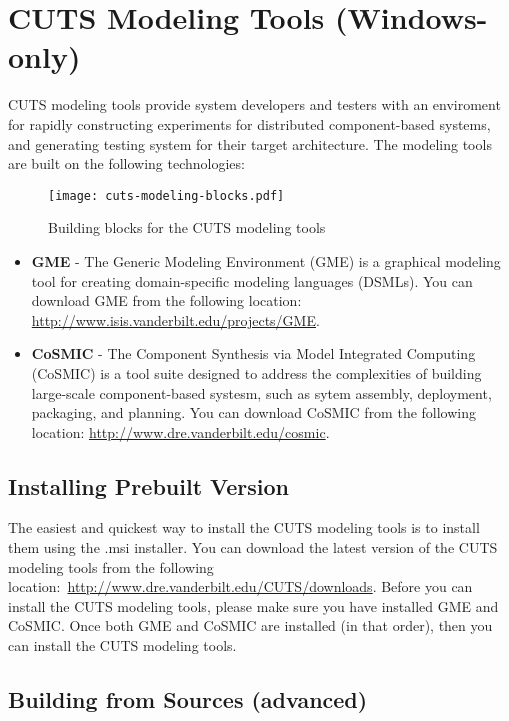 \section{CUTS Modeling Tools (Windows-only)}

CUTS modeling tools provide system developers and testers with an enviroment
for rapidly constructing experiments for distributed component-based systems,
and generating testing system for their target architecture. The modeling
tools are built on the following technologies:
\begin{figure}[htbp]
  \centering
  \texttt{[image: cuts-modeling-blocks.pdf]}
  \caption{Building blocks for the CUTS modeling tools}
  \label{fig:cuts-modeling-blocks}
\end{figure}

\begin{itemize}
  \item \textbf{GME} - The Generic Modeling Environment (GME) is a graphical
  modeling tool for creating domain-specific modeling languages (DSMLs). You
  can download GME from the following location: \url{http://www.isis.vanderbilt.edu/projects/GME}.

  \item \textbf{CoSMIC} - The Component Synthesis via Model Integrated 
  Computing (CoSMIC) is a tool suite designed to address the complexities of
  building large-scale component-based systesm, such as sytem assembly, 
  deployment, packaging, and planning. You can download CoSMIC from the following
  location: \url{http://www.dre.vanderbilt.edu/cosmic}.
\end{itemize}

\subsection{Installing Prebuilt Version}

The easiest and quickest way to install the CUTS modeling tools is to install
them using the .msi installer. You can download the latest version of the 
CUTS modeling tools from the following location:~\url{http://www.dre.vanderbilt.edu/CUTS/downloads}.
Before you can install the CUTS modeling tools, please make sure you have
installed GME and CoSMIC. Once both GME and CoSMIC are installed (in that
order), then you can install the CUTS modeling tools.

\subsection{Building from Sources (advanced)}

